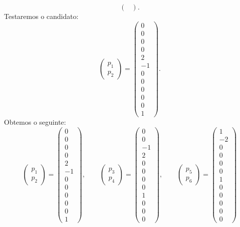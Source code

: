 \documentclass[11pt,a4paper]{article}
\begin{document}
{\[\begin{pmatrix}
\end{pmatrix}.
\]
Testaremos o candidato:
\[
\begin{pmatrix}
p_1\\p_2
\end{pmatrix}=\begin{pmatrix}
0\\0\\0\\0\\2\\-1\\0\\0\\0\\0\\0\\1
\end{pmatrix}.
\]
Obtemos o seguinte:
\[
\begin{pmatrix}
p_1\\p_2
\end{pmatrix}=\begin{pmatrix}
0\\0\\0\\0\\2\\-1\\0\\0\\0\\0\\0\\1
\end{pmatrix},\quad\quad\begin{pmatrix}
p_3\\p_4
\end{pmatrix}=\begin{pmatrix}
0\\0\\-1\\2\\0\\0\\0\\0\\1\\0\\0\\0
\end{pmatrix},\quad\quad\begin{pmatrix}
p_5\\p_6
\end{pmatrix}=\begin{pmatrix}
1\\-2\\0\\0\\0\\0\\1\\0\\0\\0\\0\\0

\end{pmatrix}\]}
\end{document}
